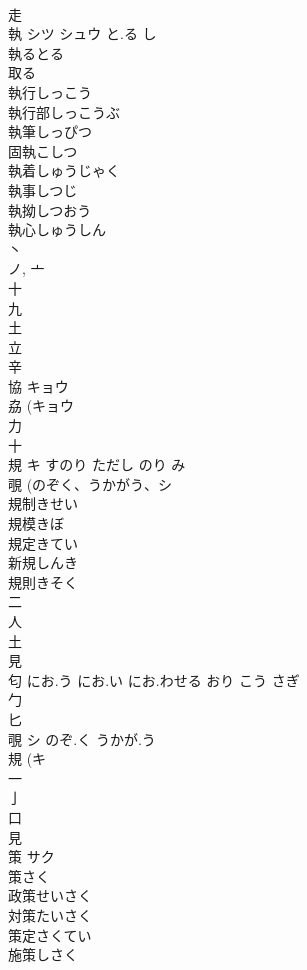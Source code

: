 \documentclass[8pt]{extreport}
\begin{document}
\begin{CJK}{UTF8}{min}
\\	走 
\\	執	シツ シュウ	と.る し	
\\	執るとる
\\	取る 
\\	執行しっこう
\\	執行部しっこうぶ
\\	執筆しっぴつ
\\	固執こしつ
\\	執着しゅうじゃく
\\	執事しつじ
\\	執拗しつおう
\\	執心しゅうしん
\\	丶 
\\	ノ, 亠 
\\	十 
\\	九 
\\	土 
\\	立 
\\	辛 
\\	協	キョウ		
\\	劦 (キョウ 
\\	力 
\\	十 
\\	規	キ	すのり ただし のり み	
\\	覗 (のぞく、うかがう、シ 
\\	規制きせい 
\\	規模きぼ 
\\	規定きてい 
\\	新規しんき 
\\	規則きそく 
\\	二 
\\	人 
\\	土 
\\	見 
\\	匂		にお.う にお.い にお.わせる おり こう さぎ	
\\	勹 
\\	匕 
\\	覗	シ	のぞ.く うかが.う	
\\	規 (キ 
\\	一 
\\	亅 
\\	口 
\\	見 
\\	策	サク		
\\	策さく 
\\	政策せいさく 
\\	対策たいさく 
\\	策定さくてい 
\\	施策しさく 

\end{CJK}
\end{document}
